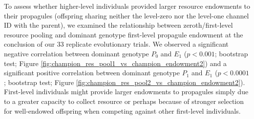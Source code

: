 To assess whether higher-level individuals provided larger resource endowments to their propagules (offspring sharing neither the level-zero nor the level-one channel ID with the parent), we examined the relationship between zeroth/first-level resource pooling and dominant genotype first-level propagule endowment at the conclusion of our 33 replicate evolutionary trials.
We observed a significant negative correlation between dominant genotype $P_0$ and $E_1$ ($p < 0.001$; bootstrap test; Figure \ref{fig:champion_res_pool1_vs_champion_endowment2}) and a significant positive correlation between dominant genotype $P_1$ and $E_1$ ($p <  0.0001$; bootstrap test; Figure \ref{fig:champion_res_pool2_vs_champion_endowment2}).
First-level individuals might provide larger endowments to propagules simply due to a greater capacity to collect resource or perhaps because of stronger selection for well-endowed offspring when competing against other first-level individuals.
